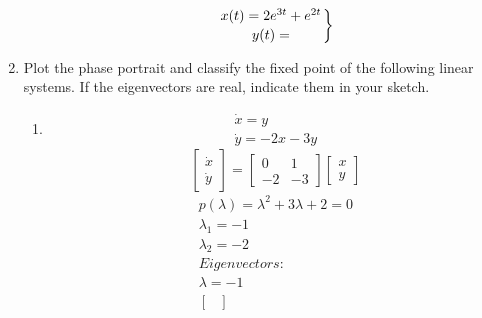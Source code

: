 \documentclass[a4paper,10pt]{article}
\begin{document}
\begin{enumerate}
\begin{enumerate}
\begin{equation}
\begin{aligned}
                        \left.
                        x(t)= 2e^{3t} + e^{2t}\atop
                        y(t)=
                        \right\}
                    \end{aligned}
                \end{equation}
        \end{enumerate}
    \item Plot the phase portrait and classify the fixed point of the following linear systems. If the eigenvectors are real, indicate them in your sketch.
        \begin{enumerate}
            \item
                \begin{equation}
                    \begin{aligned}
                        \dot{x}=y\\
                        \dot{y}=-2x-3y
                    \end{aligned}
                \end{equation}
                \begin{equation}
                    \begin{bmatrix}
                        \dot{x}\\
                        \dot{y}
                    \end{bmatrix}
                    =
                    \begin{bmatrix}
                        0 &1\\
                        -2 &-3
                    \end{bmatrix}
                    \begin{bmatrix}
                        x\\
                        y
                    \end{bmatrix}
                \end{equation}
                \begin{equation}
                    \begin{aligned}
                        p(\lambda)= \lambda^{2}+3\lambda +2=0\\
                        \lambda_{1}=-1\\
                        \lambda_{2}= -2\\
                        Eigenvectors:\\
                        \lambda=-1\\
                        \begin{bmatrix}

\end{bmatrix}
\end{aligned}
\end{equation}
\end{enumerate}
\end{enumerate}
\end{document}
